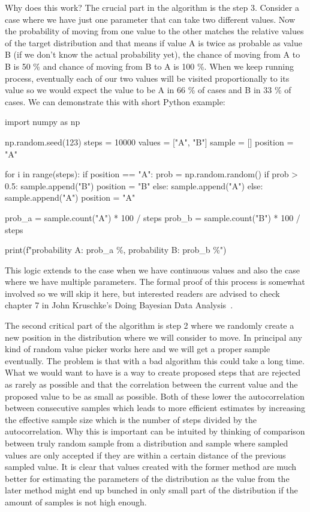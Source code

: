 \documentclass[12pt,a4paper,leqno]{report}
\theoremstyle{plain}
\theoremstyle{definition}
\theoremstyle{remark}
\begin{document}
Why does this work? The crucial part in the algorithm is the step 3. Consider a case
where we have just one parameter that can take two different values. Now the probability
of moving from one value to the other matches the relative values of the
target distribution and that means if value A is twice as probable as value B (if we don't know the
actual probability yet), the chance of moving from A to B is 50 \% and chance of moving
from B to A is 100 \%. When we keep running process, eventually each of our two values
will be visited proportionally to its value so we would expect the value to be A in 66
\% of cases and B in 33 \% of cases. We can demonstrate this with short Python
example:

\begin{pyblock}[][fontsize=\footnotesize]
import numpy as np

np.random.seed(123)
steps = 10000
values = ["A", "B"]
sample = []
position = "A"

for i in range(steps):
    if position == "A":
        prob = np.random.random()
        if prob > 0.5:
            sample.append("B")
            position = "B"
        else:
            sample.append("A")
    else:
        sample.append("A")
        position = "A"

prob_a = sample.count("A") * 100 / steps
prob_b = sample.count("B") * 100 / steps

print(f"probability A: {prob_a} \%, probability B: {prob_b} \%")
\end{pyblock}
\stdoutpythontex
\bigskip

This logic extends to the case when we have
continuous values and also the case where we have multiple parameters. The formal proof
of this process is somewhat involved so we will skip it here, but interested readers are
advised to check chapter 7 in John Kruschke's Doing Bayesian Data Analysis\ \cite{kruschke}.

The second critical part of the algorithm is step 2 where we randomly create a new
position in the distribution where we will consider to move. In principal any kind of
random value picker works here and we will get a proper sample eventually. The problem is
that with a bad algorithm this could take a long time. What we would want to have is a
way to create proposed steps that are rejected as rarely as possible and that the
correlation between the current value and the proposed value to be as small as possible.
Both of these lower the autocorrelation between consecutive samples
which leads to more efficient estimates by increasing the effective sample size which is
the number of steps divided by the autocorrelation. Why this is important can be
intuited by thinking of comparison between truly random sample from a distribution and
sample where sampled values are only accepted if they are within a certain distance of the
previous sampled value. It is clear that values created with the former method are much better for
estimating the parameters of the distribution as the value from the later method might
end up bunched in only small part of the distribution if the amount of samples is not
high enough.
\end{document}
